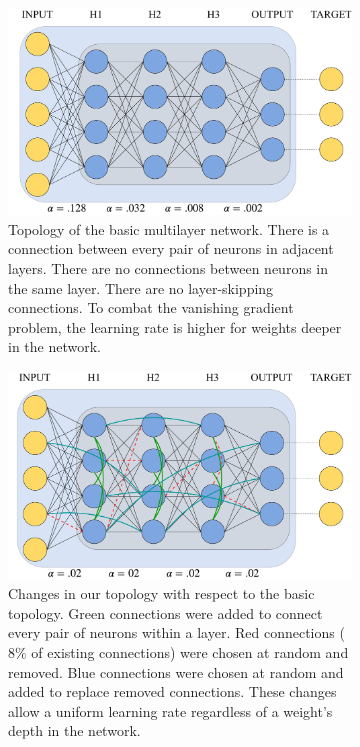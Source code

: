 \documentclass{article}
\begin{document}
\begin{figure}
  \centering
  \begin{subfigure}[t]{.48\textwidth}
    \includegraphics[width=.9\textwidth]{figures/basic_topology_illustration.pdf}
    \caption{Topology of the basic multilayer network. There is a connection between every pair of neurons in adjacent layers. There are no connections between neurons in the same layer. There are no layer-skipping connections. To combat the vanishing gradient problem, the learning rate is higher for weights deeper in the network.}
    \label{fig:top_basic}
  \end{subfigure}
  \hfill
  \begin{subfigure}[t]{.48\textwidth}
    \includegraphics[width=.9\textwidth]{figures/topology_changes_illustration.pdf}
    \caption{Changes in our topology with respect to the basic topology. Green connections were added to connect every pair of neurons within a layer. Red connections ($8\%$ of existing connections) were chosen at random and removed. Blue connections were chosen at random and added to replace removed connections. These changes allow a uniform learning rate regardless of a weight's depth in the network.}
    \label{fig:top_sw}
  \end{subfigure}
  \caption{}
  \label{fig:topology_illus}
\end{figure}
\end{document}
